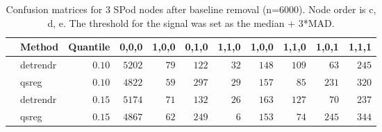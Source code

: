 \begin{table}[!tbp]
\caption{Confusion matrices for 3 SPod nodes after baseline 
      removal (n=6000). Node order is c, d, e. The threshold for the signal was 
      set as the median + 3*MAD.\label{confusion}} 
\begin{center}
\begin{tabular}{llrrrrrrrrr}
\hline\hline
\multicolumn{1}{l}{}&\multicolumn{1}{c}{Method}&\multicolumn{1}{c}{Quantile}&\multicolumn{1}{c}{0,0,0}&\multicolumn{1}{c}{1,0,0}&\multicolumn{1}{c}{0,1,0}&\multicolumn{1}{c}{1,1,0}&\multicolumn{1}{c}{1,0,0}&\multicolumn{1}{c}{1,1,0}&\multicolumn{1}{c}{1,0,1}&\multicolumn{1}{c}{1,1,1}\tabularnewline
\hline
&detrendr&$0.10$&$5202$&$79$&$122$&$32$&$148$&$109$&$ 63$&$245$\tabularnewline
&qsreg&$0.10$&$4822$&$59$&$297$&$29$&$157$&$ 85$&$231$&$320$\tabularnewline
&detrendr&$0.15$&$5174$&$71$&$132$&$26$&$163$&$127$&$ 70$&$237$\tabularnewline
&qsreg&$0.15$&$4867$&$62$&$249$&$ 6$&$153$&$ 74$&$245$&$344$\tabularnewline
\hline
\end{tabular}\end{center}
\end{table}
